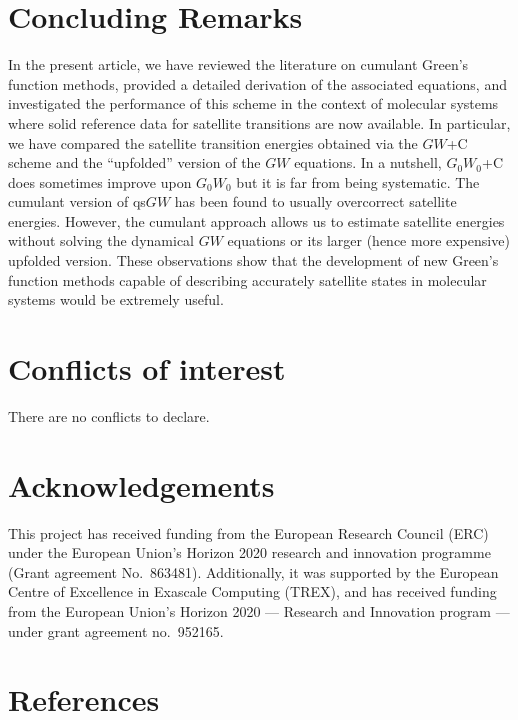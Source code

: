 \documentclass[aip,jcp,reprint,noshowkeys,superscriptaddress]{revtex4-2}
\begin{document}
\section{Concluding Remarks}
\label{sec:ccl}
In the present article, we have reviewed the literature on cumulant Green's function methods, provided a detailed derivation of the associated equations, and investigated the performance of this scheme in the context of molecular systems where solid reference data for satellite transitions are now available.
In particular, we have compared the satellite transition energies obtained via the $GW$+C scheme and the ``upfolded'' version of the $GW$ equations. 
In a nutshell, $G_0W_0$+C does sometimes improve upon $G_0W_0$ but it is far from being systematic. The cumulant version of qs$GW$ has been found to usually overcorrect satellite energies.
However, the cumulant approach allows us to estimate satellite energies without solving the dynamical $GW$ equations or its larger (hence more expensive) upfolded version. 
These observations show that the development of new Green's function methods capable of describing accurately satellite states in molecular systems would be extremely useful.

\section*{Conflicts of interest}
There are no conflicts to declare.

\section*{Acknowledgements}
This project has received funding from the European Research Council (ERC) under the European Union's Horizon 2020 research and innovation programme (Grant agreement No.~863481). Additionally, it was supported by the European Centre of Excellence in Exascale Computing (TREX), and has received funding from the European Union's Horizon 2020 --- Research and Innovation program --- under grant agreement no.~952165.

\section*{References}


\end{document}
